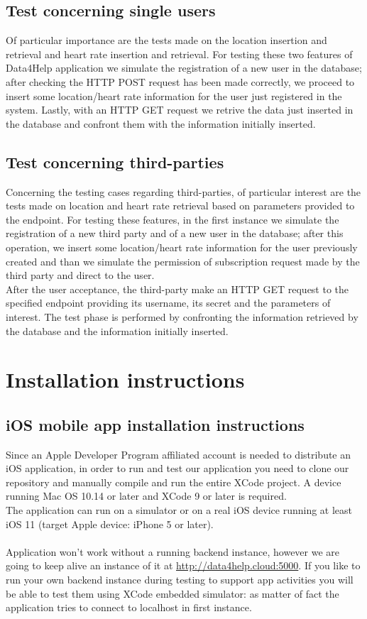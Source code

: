 \documentclass{article}
\begin{document}
\subsection{Test concerning single users}
Of particular importance are the tests made on the location insertion and retrieval and heart rate insertion and retrieval.
For testing these two features of Data4Help application we simulate the registration of a new user in the database; after checking the HTTP POST request has been made correctly, we proceed to insert some location/heart rate information for the user just registered in the system. Lastly, with an HTTP GET request we retrive the data just inserted in the database and confront them with the information initially inserted.

\subsection{Test concerning third-parties}
Concerning the testing cases regarding third-parties, of particular interest are the tests made on location and heart rate retrieval based on parameters provided to the endpoint.
For testing these features, in the first instance we simulate the registration of a new third party and of a new user in the database; after this operation, we insert some location/heart rate information for the user previously created and than we simulate the permission of subscription request made by the third party and direct to the user. \\
After the user acceptance, the third-party make an HTTP GET request to the specified endpoint providing its username, its secret and the parameters of interest.
The test phase is performed by confronting the information retrieved by the database and the information initially inserted.  


\newpage
\section{Installation instructions}

\subsection{iOS mobile app installation instructions}
Since an Apple Developer Program affiliated account is needed to distribute an iOS application, in order to run and test our application you need to clone our repository and manually compile and run the entire XCode project. A device running Mac OS 10.14 or later and XCode 9 or later is required. \\
	The application can run on a simulator or on a real iOS device running at least iOS 11 (target Apple device: iPhone 5 or later).	\\\\
	Application won't work without a running backend instance, however we are going to keep alive an instance of it at \url{http://data4help.cloud:5000}.
	If you like to run your own backend instance during testing to support app activities you will be able to test them using XCode embedded simulator: as matter of fact the application tries to connect to localhost in first instance.
	
\end{document}
